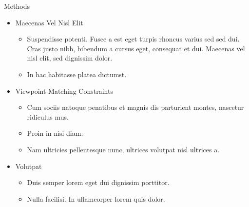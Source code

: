 \documentclass[final,hyperref={pdfpagelabels=false}]{beamer}
\begin{document}
\begin{frame}[t]
\begin{columns}[t]
\begin{column}{.465\textwidth}

            \begin{block}{Methods}

                \begin{itemize}
                    \item Maecenas Vel Nisl Elit
                          \begin{itemize}
                              \item Suspendisse potenti. Fusce a est eget turpis rhoncus varius sed sed dui. Cras justo nibh, bibendum a cursus eget, consequat et dui. Maecenas vel nisl elit, sed dignissim dolor.
                              \item In hac habitasse platea dictumst.
                          \end{itemize}

                    \item Viewpoint Matching Constraints
                          \begin{itemize}
                              \item Cum sociis natoque penatibus et magnis dis parturient montes, nascetur ridiculus mus.
                              \item Proin in nisi diam.
                              \item Nam ultricies pellentesque nunc, ultrices volutpat nisl ultrices a.
                          \end{itemize}

                    \item Volutpat
                          \begin{itemize}
                              \item Duis semper lorem eget dui dignissim porttitor.
                              \item Nulla facilisi. In ullamcorper lorem quis dolor.
                          \end{itemize}
                \end{itemize}

            \end{block}



\end{column}
\end{columns}
\end{frame}
\end{document}
